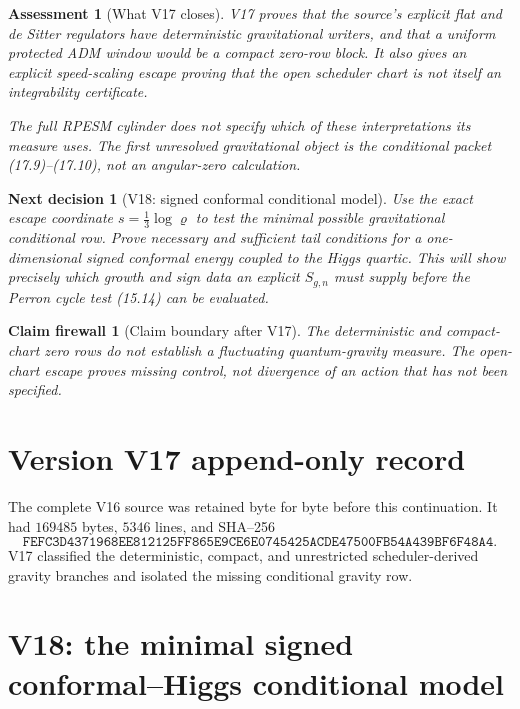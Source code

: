 \documentclass[11pt]{article}
\newtheorem{firewall}[theorem]{Claim firewall}
\newtheorem{decision}[theorem]{Next decision}
\newtheorem{assessment}[theorem]{Assessment}
\theoremstyle{remark}
\begin{document}
\begin{assessment}[What V17 closes]
\label{ass:v17v17-status}
V17 proves that the source's explicit flat and de Sitter
regulators have deterministic gravitational writers, and that a
uniform protected ADM window would be a compact zero-row block.
It also gives an explicit speed-scaling escape proving that the
open scheduler chart is not itself an integrability certificate.

The full RPESM cylinder does not specify which of these
interpretations its measure uses.  The first unresolved
gravitational object is the conditional packet (17.9)--(17.10), not
an angular-zero calculation.
\end{assessment}

\begin{decision}[V18: signed conformal conditional model]
\label{dec:v17v17-next}
Use the exact escape coordinate \(s=\frac13\log\varrho\) to test
the minimal possible gravitational conditional row.  Prove
necessary and sufficient tail conditions for a one-dimensional
signed conformal energy coupled to the Higgs quartic.  This will
show precisely which growth and sign data an explicit \(S_{g,n}\)
must supply before the Perron cycle test (15.14) can be evaluated.
\end{decision}

\begin{firewall}[Claim boundary after V17]
\label{fire:v17v17}
The deterministic and compact-chart zero rows do not establish a
fluctuating quantum-gravity measure.  The open-chart escape proves
missing control, not divergence of an action that has not been
specified.
\end{firewall}

\section*{Version V17 append-only record}
The complete V16 source was retained byte for byte before this
continuation.  It had \(169485\) bytes, \(5346\) lines, and SHA--256
\[
 \texttt{FEFC3D4371968EE812125FF865E9CE6E0745425ACDE47500FB54A439BF6F48A4}.
\]
V17 classified the deterministic, compact, and unrestricted
scheduler-derived gravity branches and isolated the missing
conditional gravity row.


\section{V18: the minimal signed conformal--Higgs conditional model}
\label{sec:v17v18}
\end{document}
